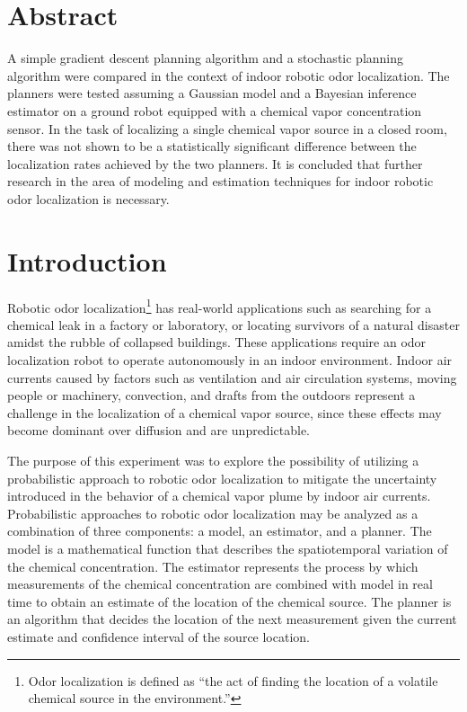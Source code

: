\documentclass[submit, 12pt]{aiaa-pretty-modified}
\begin{document}


\newpage
\section*{Abstract}
  A simple gradient descent planning algorithm and a stochastic planning
  algorithm were compared in the context of indoor robotic odor localization.
  The planners were tested assuming a Gaussian model and a Bayesian inference
  estimator on a ground robot equipped with a chemical vapor concentration
  sensor. In the task of localizing a single chemical vapor source in a closed
  room, there was not shown to be a statistically significant difference between
  the localization rates achieved by the two planners. It is concluded that
  further research in the area of modeling and estimation techniques for indoor
  robotic odor localization is necessary.


\newpage

\tableofcontents

\newpage

\listoffigures

\newpage

\listoftables

\newpage
\onehalfspace

\section{Introduction}

Robotic odor localization\footnote{Odor localization
  is defined as ``the act of finding the location of a
volatile chemical source in the environment.''\cite{kowadlo}} has real-world applications such as searching for a chemical leak in a
factory or laboratory, or locating survivors of a natural disaster
amidst the rubble of collapsed buildings.  These applications require an odor localization robot to operate autonomously
in an indoor environment.  Indoor air currents caused by
factors such as
ventilation and air circulation systems, moving people or machinery,
convection, and drafts from the outdoors represent a challenge in the
localization of a chemical vapor source,
since these effects may become dominant over diffusion and are unpredictable.

The purpose of this experiment was to explore the possibility of
utilizing a probabilistic approach to robotic odor localization to mitigate the uncertainty
introduced in the behavior of a chemical vapor plume by indoor
air currents.  Probabilistic approaches to robotic odor localization may be analyzed as a combination of
three components: a model, an estimator, and a planner. The model is a
mathematical function that describes the spatiotemporal variation of the
chemical concentration. The estimator represents the process by which
measurements of the chemical concentration are combined with model in real time
to obtain an estimate of the location of the chemical source. The planner is an
algorithm that decides the location of the next measurement given the current
estimate and confidence interval of the source location.
\end{document}
